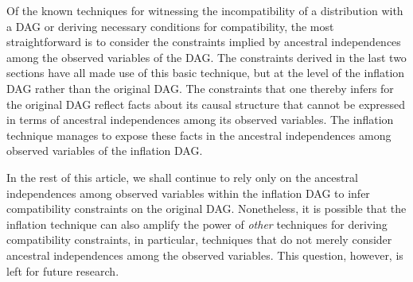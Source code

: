 Of the known techniques for witnessing the incompatibility of a distribution with a DAG or deriving necessary conditions for compatibility, the most straightforward is to consider the constraints implied by ancestral independences among the observed variables of the DAG. 
The constraints derived in the last two sections have all made use of this basic technique, but at the level of the inflation DAG rather than the original DAG.  The constraints that one thereby infers for the original DAG reflect facts about its causal structure that cannot be expressed in terms of ancestral independences among its observed variables.  The inflation technique manages to expose these facts in the ancestral independences among observed variables of the inflation DAG.


In the rest of this article, we shall continue to rely only on the ancestral independences among observed variables within the inflation DAG to infer compatibility constraints on the original DAG.   Nonetheless, it is possible that the inflation technique can also amplify the power of {\em other} techniques for deriving compatibility constraints, in particular, techniques that do not merely consider ancestral independences among the observed variables.  This question, however, is left for future research.

